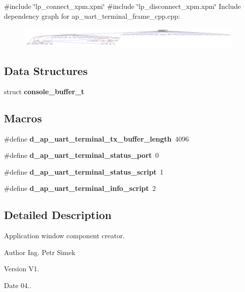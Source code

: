 {\ttfamily \#include \char`\"{}lp\+\_\+connect\+\_\+xpm.\+xpm\char`\"{}}\newline
{\ttfamily \#include \char`\"{}lp\+\_\+disconnect\+\_\+xpm.\+xpm\char`\"{}}\newline
Include dependency graph for ap\+\_\+uart\+\_\+terminal\+\_\+frame\+\_\+cpp.\+cpp\+:
\nopagebreak
\begin{figure}[H]
\begin{center}
\leavevmode
\includegraphics[width=350pt]{ap__uart__terminal__frame__cpp_8cpp__incl}
\end{center}
\end{figure}
\subsection*{Data Structures}
\begin{DoxyCompactItemize}
\item 
struct \textbf{ console\+\_\+buffer\+\_\+t}
\end{DoxyCompactItemize}
\subsection*{Macros}
\begin{DoxyCompactItemize}
\item 
\#define \textbf{ d\+\_\+ap\+\_\+uart\+\_\+terminal\+\_\+tx\+\_\+buffer\+\_\+length}~4096
\item 
\#define {\bfseries d\+\_\+ap\+\_\+uart\+\_\+terminal\+\_\+status\+\_\+port}~0
\item 
\#define {\bfseries d\+\_\+ap\+\_\+uart\+\_\+terminal\+\_\+status\+\_\+script}~1
\item 
\#define {\bfseries d\+\_\+ap\+\_\+uart\+\_\+terminal\+\_\+info\+\_\+script}~2
\end{DoxyCompactItemize}


\subsection{Detailed Description}
Application window component creator. 

\begin{DoxyAuthor}{Author}
Ing. Petr Simek 
\end{DoxyAuthor}
\begin{DoxyVersion}{Version}
V1. 
\end{DoxyVersion}
\begin{DoxyDate}{Date}
04.. 
\end{DoxyDate}

